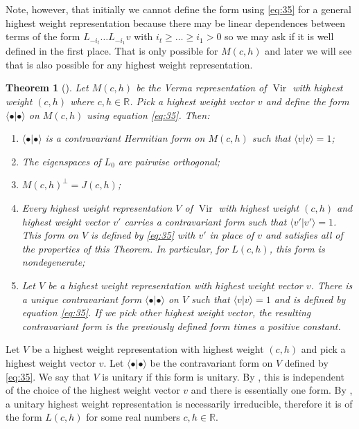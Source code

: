 \documentclass[a4paper, 12pt, reqno]{amsart}
\newtheorem{theorem}{Theorem}[subsection]
\theoremstyle{remark}
\numberwithin{equation}{subsection}
\DeclareMathOperator{\Vir}{Vir}
\begin{document}
Note, however, that initially we cannot define the form using \eqref{eq:35} for a general highest weight representation because there may be linear dependences between terms of the form $L_{-i_t}\dots L_{-i_1}v$ with $i_t \ge \dots \ge i_1 > 0$ so we may ask if it is well defined in the first place.
That is only possible for $M(c, h)$ and later we will see that is also possible for any highest weight representation.

\begin{theorem}[{\cite[Proposition 3.4]{kac_bombay_2013}}]
  \label{thr:26}
  Let $M(c, h)$ be the Verma representation of $\Vir$ with highest weight $(c, h)$ where $c, h \in \mathbb{R}$.
  Pick a highest weight vector $v$ and define the form $\langle \bullet| \bullet\rangle$ on $M(c, h)$ using equation \eqref{eq:35}.
  Then:
  \begin{enumerate}
  \item $\langle \bullet| \bullet\rangle$ is a contravariant Hermitian form on $M(c, h)$ such that $\langle v| v\rangle = 1$;
  \item The eigenspaces of $L_0$ are pairwise orthogonal;
  \item $M(c, h)^{\perp} = J(c, h)$;
  \item Every highest weight representation $V$ of $\Vir$ with highest weight $(c, h)$ and highest weight vector $v'$ carries a contravariant form such that $\langle v'| v'\rangle = 1$.
    This form on $V$ is defined by \eqref{eq:35} with $v'$ in place of $v$ and satisfies all of the properties of this Theorem.
    In particular, for $L(c, h)$, this form is nondegenerate;
  \item Let $V$ be a highest weight representation with highest weight vector $v$.
    There is a unique contravariant form $\langle \bullet| \bullet\rangle$ on $V$ such that $\langle v| v\rangle = 1$ and is defined by equation \eqref{eq:35}.
    If we pick other highest weight vector, the resulting contravariant form is the previously defined form times a positive constant.
  \end{enumerate}
\end{theorem}

Let $V$ be a highest weight representation with highest weight $(c, h)$ and pick a highest weight vector $v$.
Let $\langle \bullet| \bullet\rangle$ be the contravariant form on $V$ defined by \eqref{eq:35}.
We say that $V$ is unitary if this form is unitary.
By , this is independent of the choice of the highest weight vector $v$ and there is essentially one form.
By , a unitary highest weight representation is necessarily irreducible, therefore it is of the form $L(c, h)$ for some real numbers $c, h \in \mathbb{R}$.
\end{document}
